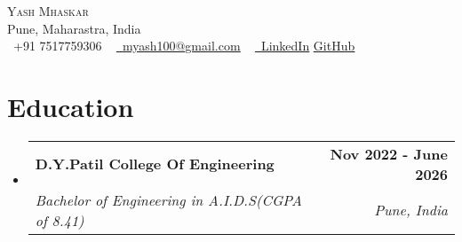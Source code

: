 \documentclass[letterpaper,11pt]{article}
\makeatletter
\newcommand{\resumeItem}[1]{
  \item\small{
	{#1 \vspace{-2pt}}
  }
}
\newcommand{\resumeSubheading}[4]{
  \vspace{-2pt}\item
	\begin{tabular*}{1.0\textwidth}[t]{l@{\extracolsep{\fill}}r}
  	\textbf{#1} & \textbf{\small #2} \\
  	\textit{\small#3} & \textit{\small #4} \\
	\end{tabular*}\vspace{-7pt}
}
\newcommand{\resumeSubHeadingListStart}{\begin{itemize}[leftmargin=0.0in, label={}]}
\newcommand{\resumeSubHeadingListEnd}{\end{itemize}}
\newcommand{\resumeItemListStart}{\begin{itemize}}
\newcommand{\resumeItemListEnd}{\end{itemize}\vspace{-5pt}}
\makeatother
\begin{document}

\begin{center}
	{\Huge \scshape Yash Mhaskar} \\ \vspace{1pt}
	Pune, Maharastra, India \\ \vspace{1.5pt}
	\small \raisebox{-0.1\height}\faPhone\ +91 7517759306 ~ \href{mailto:choudhari.piyush@gmail.com}{\raisebox{-0.2\height}\faEnvelope\  \underline{myash100@gmail.com}} ~
	\href{https://www.linkedin.com/in/yash-mhaskar21/}{\raisebox{-0.2\height}\faLinkedin\ \underline{LinkedIn}}
	\href{https://github.com/Myash21}{\raisebox{-0.2\height}\faGithubSquare \underline{ GitHub}}
	
    \vspace{-8pt}
\end{center}


\section{Education}
  \resumeSubHeadingListStart
	\resumeSubheading
  	{D.Y.Patil College Of Engineering}{Nov 2022 - June 2026}
  	{Bachelor of Engineering in A.I.D.S(CGPA of 8.41)} {Pune, India}
  \resumeSubHeadingListEnd


    
\end{document}
